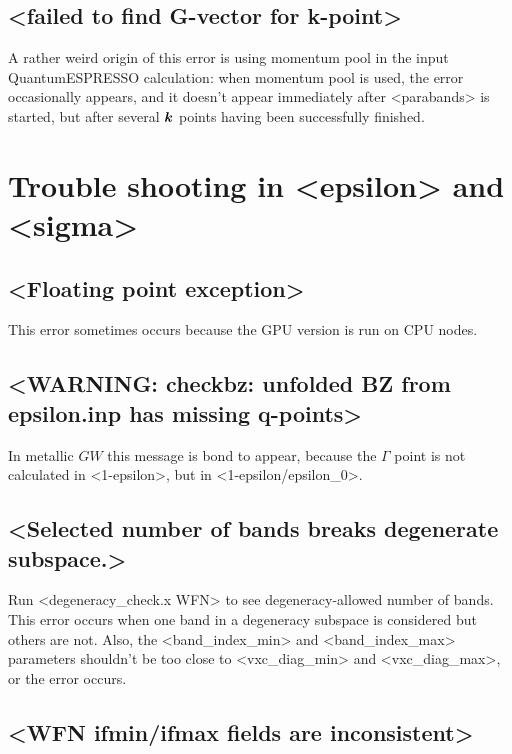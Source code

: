 \documentclass[hyperref, a4paper, 12pt]{report}
\def\texttt#1{<#1>}%
\newcommand{\shortcode}[1]{\texttt{#1}}
\begin{document}
\subsection{\shortcode{failed to find G-vector for k-point}}

A rather weird origin of this error 
is using momentum pool in the input QuantumESPRESSO calculation:
when momentum pool is used, 
the error occasionally appears, 
and it doesn't appear immediately after \shortcode{parabands} is started, 
but after several $\vb*{k}$ points having been successfully finished.

\section{Trouble shooting in \shortcode{epsilon} and \shortcode{sigma}}

\subsection{\shortcode{Floating point exception}}

This error sometimes occurs because the GPU version is run on CPU nodes.

\subsection{\shortcode{WARNING: checkbz: unfolded BZ from epsilon.inp has missing q-points}}

In metallic $GW$ this message is bond to appear,
because the $\Gamma$ point is not calculated in \shortcode{1-epsilon},
but in \shortcode{1-epsilon/epsilon_0}.

\subsection{\shortcode{Selected number of bands breaks degenerate subspace.}}\label{sec:degenerate-breaking}

Run \shortcode{degeneracy_check.x WFN} to see degeneracy-allowed number of bands.
This error occurs when one band in a degeneracy subspace is considered 
but others are not.
Also, the \shortcode{band_index_min} and \shortcode{band_index_max} parameters
shouldn't be too close to \shortcode{vxc_diag_min} and \shortcode{vxc_diag_max}, 
or the error occurs.

\subsection{\shortcode{WFN ifmin/ifmax fields are inconsistent}}\label{sec:semimetal-error-1}
\end{document}
